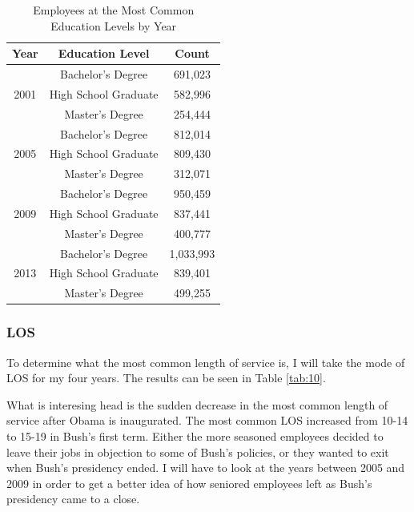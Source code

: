 \documentclass{article}
\begin{document}
            \begin{center}
                \begin{table}
                    \centering
                    \begin{tabular}{ |c|c|c| }
                        \hline
                        Year & Education Level & Count \\
                        \hline
                        & Bachelor's Degree & 691,023 \\
                        2001 & High School Graduate & 582,996 \\
                        & Master's Degree & 254,444 \\
                        \hline
                        & Bachelor's Degree & 812,014 \\
                        2005 & High School Graduate & 809,430 \\
                        & Master's Degree & 312,071 \\
                        \hline
                        & Bachelor's Degree & 950,459 \\
                        2009 & High School Graduate & 837,441 \\
                        & Master's Degree & 400,777 \\
                        \hline
                        & Bachelor's Degree & 1,033,993 \\
                        2013 & High School Graduate & 839,401 \\
                        & Master's Degree & 499,255 \\
                        \hline
                    \end{tabular}
                    \caption{Employees at the Most Common Education Levels by Year}
                    \label{tab:9}
                \end{table}
            \end{center}

        \subsubsection{LOS}
        To determine what the most common length of service is, I will take the mode of LOS for my four years. The results can be seen in Table \ref{tab:10}.
        \par
        What is interesing head is the sudden decrease in the most common length of service after Obama is inaugurated. The most common LOS increased from 10-14 to 15-19 in Bush's first term. Either the more seasoned employees decided to leave their jobs in objection to some of Bush's policies, or they wanted to exit when Bush's presidency ended. I will have to look at the years between 2005 and 2009 in order to get a better idea of how seniored employees left as Bush's presidency came to a close.
\end{document}
